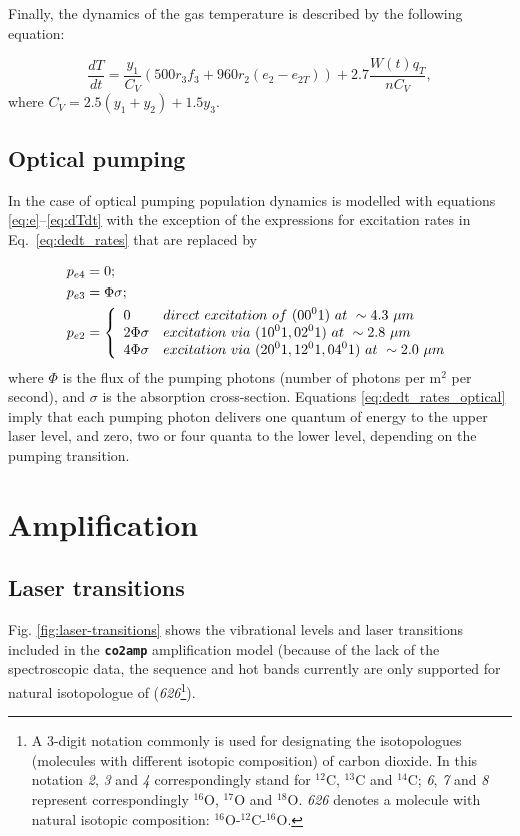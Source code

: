 \documentclass{report}
\begin{document}
Finally, the dynamics of the gas temperature is described by the following equation:

\begin{equation}\label{eq:dTdt}
\frac{dT}{dt} = \frac{y_1}{C_V}(500r_3f_3 + 960r_2(e_2-e_{2T})) + 2.7\frac{W(t)q_T}{nC_V},
\end{equation}
where $C_V = 2.5(y_1+y_2) + 1.5y_3$.


\subsection{Optical pumping}
In the case of optical pumping population dynamics is modelled with equations \ref{eq:e}--\ref{eq:dTdt} with the exception of the expressions for excitation rates in Eq.~\ref{eq:dedt_rates} that are replaced by

\begin{equation}\label{eq:dedt_rates_optical}
\begin{aligned}
&p_{e4} = 0;\\
&p_{e3} = \Phi \sigma;\\
&p_{e2} = \left\{
  \begin{array}{>{\displaystyle}l>{\displaystyle}l}
  0             & direct~excitation~of~(00^01)~at~\sim4.3~{\mu}m\\
  2 \Phi \sigma & excitation~via~(10^01, 02^01)~at~\sim2.8~{\mu}m\\
  4 \Phi \sigma & excitation~via~(20^01, 12^01, 04^01)~at~\sim2.0~{\mu}m
  \end{array}
  \right.
\end{aligned}
\end{equation}
where $\Phi$ is the flux of the pumping photons (number of photons per $\text{m}^2$ per second), and $\sigma$ is the absorption cross-section. Equations \ref{eq:dedt_rates_optical} imply that each pumping photon delivers one quantum of energy to the upper laser level, and zero, two or four quanta to the lower level, depending on the pumping transition.



\section{Amplification}

\subsection{Laser transitions}
Fig. \ref{fig:laser-transitions} shows the vibrational levels and laser transitions included in the \textbf{\texttt{co2amp}} amplification model (because of the lack of the spectroscopic data, the sequence and hot bands currently are only supported for natural isotopologue of  (\textit{626}\footnote{A 3-digit notation commonly is used for designating the isotopologues (molecules with different isotopic composition) of carbon dioxide. In this notation \textit{2}, \textit{3} and \textit{4} correspondingly stand for {$^{12}$C}, {$^{13}$C} and {$^{14}$C}; \textit{6}, \textit{7} and \textit{8} represent  correspondingly {$^{16}$O}, {$^{17}$O} and {$^{18}$O}. \textit{626} denotes a  molecule with natural isotopic composition: {{$^{16}$O}-{$^{12}$C}-{$^{16}$O}}.}).
\end{document}
